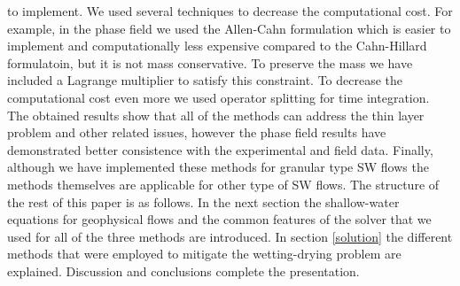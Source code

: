 \documentclass[letterpaper,10pt]{article}
\begin{document}
to implement. We used several techniques to decrease the computational cost. For example, in the phase field we used the Allen-Cahn formulation which is easier to implement and computationally less 
expensive compared to the Cahn-Hillard formulatoin, but it is not mass conservative. To preserve the mass we have included a Lagrange multiplier to satisfy this constraint. 
To decrease the computational cost even more we used operator splitting for time integration. The obtained results show that all of the methods can address the thin layer problem and other 
related issues, however the phase field results have demonstrated better consistence with the experimental and field data. 
Finally, although we have implemented these methods for granular type SW flows the methods themselves are applicable for other type of SW flows.  
The structure of the rest of this paper is as follows. In the next section the shallow-water equations for geophysical flows and 
the common features of the solver that we used for all of the three methods are 
introduced. In section \ref{solution} the different methods that were employed to mitigate the wetting-drying problem are explained. 
Discussion and conclusions complete the presentation.
\end{document}
